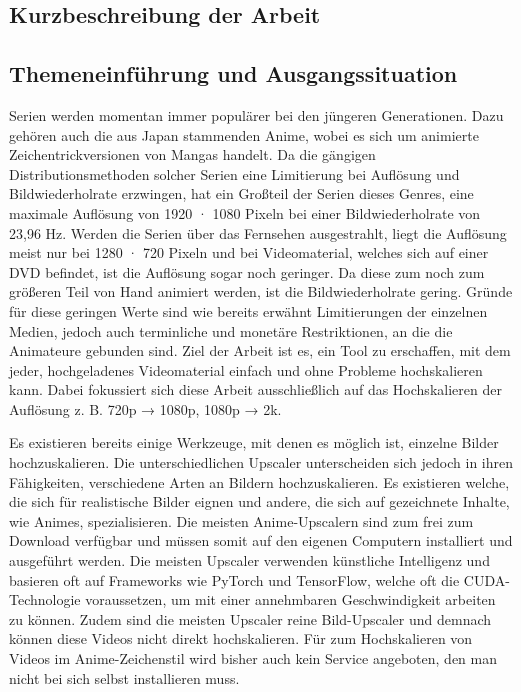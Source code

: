 \begin{onehalfspace}
	
\chapter{Kurzbeschreibung der Arbeit}

\section{Themeneinführung und Ausgangssituation}
Serien werden momentan immer populärer bei den jüngeren Generationen. Dazu gehören auch die aus Japan stammenden Anime, wobei es sich um animierte Zeichentrickversionen von Mangas handelt. Da die gängigen Distributionsmethoden solcher Serien eine Limitierung bei Auflösung und Bildwiederholrate erzwingen, hat ein Großteil der Serien dieses Genres, eine maximale Auflösung von 1920 · 1080 Pixeln bei einer Bildwiederholrate von 23,96 Hz. Werden die Serien über das Fernsehen ausgestrahlt, liegt die Auflösung meist nur bei 1280 · 720 Pixeln und bei Videomaterial, welches sich auf einer DVD befindet, ist die Auflösung sogar noch geringer. Da diese zum noch zum größeren Teil von Hand animiert werden, ist die Bildwiederholrate gering.  Gründe für diese geringen Werte sind wie bereits erwähnt Limitierungen der einzelnen Medien, jedoch auch terminliche und monetäre Restriktionen, an die die Animateure gebunden sind. Ziel der Arbeit ist es, ein Tool zu erschaffen, mit dem jeder, hochgeladenes Videomaterial einfach und ohne Probleme hochskalieren kann. Dabei fokussiert sich diese Arbeit ausschließlich auf das Hochskalieren der Auflösung z. B. 720p → 1080p, 1080p → 2k. 

Es existieren bereits einige Werkzeuge, mit denen es möglich ist, einzelne Bilder hochzuskalieren. Die unterschiedlichen Upscaler unterscheiden sich jedoch in ihren Fähigkeiten, verschiedene Arten an Bildern hochzuskalieren. Es existieren welche, die sich für realistische Bilder eignen und andere, die sich auf gezeichnete Inhalte, wie Animes, spezialisieren. Die meisten Anime-Upscalern sind zum frei zum Download verfügbar und müssen somit auf den eigenen Computern installiert und ausgeführt werden. Die meisten Upscaler verwenden künstliche Intelligenz und basieren oft auf Frameworks wie PyTorch und TensorFlow, welche oft die CUDA-Technologie voraussetzen, um mit einer annehmbaren Geschwindigkeit arbeiten zu können. Zudem sind die meisten Upscaler reine Bild-Upscaler und demnach können diese Videos nicht direkt hochskalieren. Für zum Hochskalieren von Videos im Anime-Zeichenstil wird bisher auch kein Service angeboten, den man nicht bei sich selbst installieren muss.


\end{onehalfspace}
